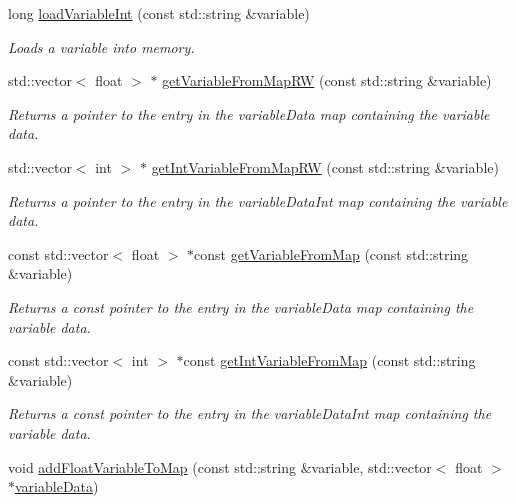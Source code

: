 \begin{DoxyCompactItemize}
long \hyperlink{classccmc_1_1_model_a05c373d53a6bdb5b3f9663e129fb35c1}{load\-Variable\-Int} (const std\-::string \&variable)
\begin{DoxyCompactList}\small\item\em Loads a variable into memory. \end{DoxyCompactList}\item 
std\-::vector$<$ float $>$ $\ast$ \hyperlink{classccmc_1_1_model_a455cb13509b48380741fbcc84ccec405}{get\-Variable\-From\-Map\-R\-W} (const std\-::string \&variable)
\begin{DoxyCompactList}\small\item\em Returns a pointer to the entry in the variable\-Data map containing the variable data. \end{DoxyCompactList}\item 
std\-::vector$<$ int $>$ $\ast$ \hyperlink{classccmc_1_1_model_a9d18c0f94f6731926399c1a93b429298}{get\-Int\-Variable\-From\-Map\-R\-W} (const std\-::string \&variable)
\begin{DoxyCompactList}\small\item\em Returns a pointer to the entry in the variable\-Data\-Int map containing the variable data. \end{DoxyCompactList}\item 
const std\-::vector$<$ float $>$ $\ast$const \hyperlink{classccmc_1_1_model_a6c18b6296eaf1455866c860aeba694ee}{get\-Variable\-From\-Map} (const std\-::string \&variable)
\begin{DoxyCompactList}\small\item\em Returns a const pointer to the entry in the variable\-Data map containing the variable data. \end{DoxyCompactList}\item 
const std\-::vector$<$ int $>$ $\ast$const \hyperlink{classccmc_1_1_model_a508098e881d48a4a9e878bd7f859d8e5}{get\-Int\-Variable\-From\-Map} (const std\-::string \&variable)
\begin{DoxyCompactList}\small\item\em Returns a const pointer to the entry in the variable\-Data\-Int map containing the variable data. \end{DoxyCompactList}\item 
void \hyperlink{classccmc_1_1_model_aff1ba4d83008b75f65a3f0a30013b895}{add\-Float\-Variable\-To\-Map} (const std\-::string \&variable, std\-::vector$<$ float $>$ $\ast$\hyperlink{classccmc_1_1_model_a69edb30c3bc8ce3c68ec0a883c219d94}{variable\-Data})
\item 

\end{DoxyCompactItemize}
